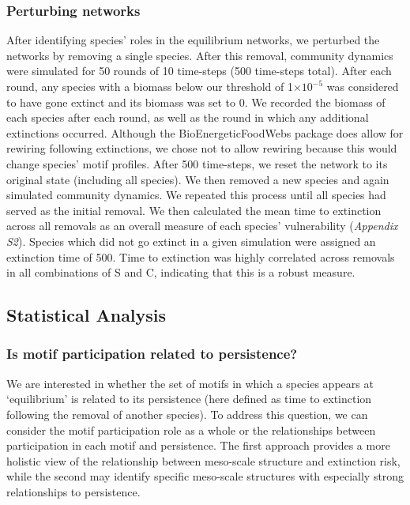 \documentclass[12pt]{article}
\begin{document}
\begin{spacing}{2.0}
    	\subsubsection*{Perturbing networks}
    
    		After identifying species' roles in the equilibrium networks, we perturbed the networks by removing a single species. After this removal, community dynamics were simulated for 50 rounds of 10 time-steps (500 time-steps total). After each round, any species with a biomass below our threshold of 1$\times10^{-5}$ was considered to have gone extinct and its biomass was set to 0. We recorded the biomass of each species after each round, as well as the round in which any additional extinctions occurred. Although the BioEnergeticFoodWebs package does allow for rewiring following extinctions, we chose not to allow rewiring because this would change species' motif profiles. After 500 time-steps, we reset the network to its original state (including all species). We then removed a new species and again simulated community dynamics. We repeated this process until all species had served as the initial removal.
    		We then calculated the mean time to extinction across all removals as an overall measure of each species' vulnerability (\emph{Appendix S2}). 
    		Species which did not go extinct in a given simulation were assigned an extinction time of 500.
    		Time to extinction was highly correlated across removals in all combinations of S and C, indicating that this is a robust measure.


	\subsection*{Statistical Analysis}

        \subsubsection*{Is motif participation related to persistence?}

            We are interested in whether the set of motifs in which a species appears at `equilibrium' is related to its persistence (here defined as time to extinction following the removal of another species). 
            To address this question, we can consider the motif participation role as a whole or the relationships between participation in each motif and persistence. 
            The first approach provides a more holistic view of the relationship between meso-scale structure and extinction risk, while the second may identify specific meso-scale structures with especially strong relationships to persistence.


\end{spacing}
\end{document}
